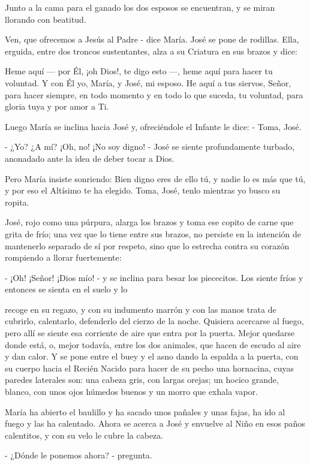 \documentclass[12pt, twoside, openright]{book} %
\begin{document}
Junto a la cama para el ganado los dos esposos se encuentran, y se miran llorando con beatitud. 

Ven, que ofrecemos a Jesús al Padre - dice María. José se pone de rodillas. Ella, erguida, entre dos troncos sustentantes, alza a su Criatura en sus brazos y dice: 

Heme aquí — por Él, ¡oh Dios!, te digo esto —, heme aquí para hacer tu voluntad. Y con Él yo, María, y José, mi esposo. He aquí a tus siervos, Señor, para hacer siempre, en todo momento y en todo lo que suceda, tu voluntad, para gloria tuya y por amor a Ti. 

Luego María se inclina hacia José y, ofreciéndole el Infante le dice: - Toma, José. 

- ¿Yo? ¿A mí? ¡Oh, no! ¡No soy digno! - José se siente profundamente turbado, anonadado ante la idea de deber tocar a Dios. 

Pero María insiste sonriendo: Bien digno eres de ello tú, y nadie lo es más que tú, y por eso el Altísimo te ha elegido. Toma, José, tenlo mientras yo busco su ropita. 

José, rojo como una púrpura, alarga los brazos y toma ese copito de carne que grita de frío; una vez que lo tiene entre sus brazos, no persiste en la intención de mantenerlo separado de sí por respeto, sino que lo estrecha contra su corazón rompiendo a llorar fuertemente: 

- ¡Oh! ¡Señor! ¡Dios mío! - y se inclina para besar los piececitos. Los siente fríos y entonces se sienta en el suelo y lo 

recoge en su regazo, y con su indumento marrón y con las manos trata de cubrirlo, calentarlo, defenderlo del cierzo de la noche. Quisiera acercarse al fuego, pero allí se siente esa corriente de aire que entra por la puerta. Mejor quedarse donde está, o, mejor todavía, entre los dos animales, que hacen de escudo al aire y dan calor. Y se pone entre el buey y el asno dando la espalda a la puerta, con su cuerpo hacia el Recién Nacido para hacer de su pecho una hornacina, cuyas paredes laterales son: una cabeza gris, con largas orejas; un hocico grande, blanco, con unos ojos húmedos buenos y un morro que exhala vapor. 

María ha abierto el baulillo y ha sacado unos pañales y unas fajas, ha ido al fuego y las ha calentado. Ahora se acerca a José y envuelve al Niño en esos paños calentitos, y con su velo le cubre la cabeza. 

- ¿Dónde le ponemos ahora? - pregunta. 
\end{document}
